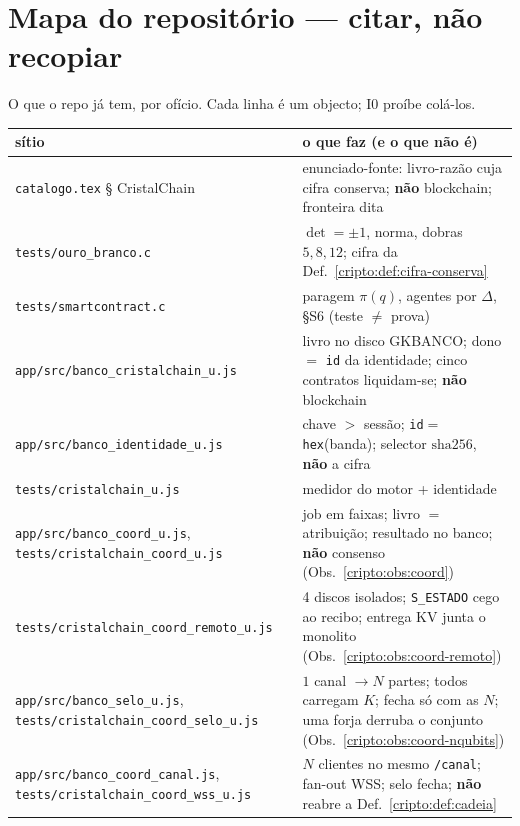 \documentclass[11pt,a4paper]{article}
\newcommand{\code}[1]{\texttt{\small #1}}
\begin{document}
\section{Mapa do repositório --- citar, não recopiar}\label{cripto:mapa}

O que o repo já tem, por ofício. Cada linha é um objecto;
I0 proíbe colá-los.

\begin{center}\small
\begin{tabular}{@{}p{}p{}@{}}
\toprule
sítio & o que faz (e o que \textbf{não} é) \\
\midrule
\code{catalogo.tex} § CristalChain
  & enunciado-fonte: livro-razão cuja cifra conserva;
    \textbf{não} blockchain; fronteira dita \\
\code{tests/ouro\_branco.c}
  & $\det=\pm1$, norma, dobras $5,8,12$; cifra da Def.~\ref{cripto:def:cifra-conserva} \\
\code{tests/smartcontract.c}
  & paragem $\pi(q)$, agentes por $\Delta$, §S6 (teste $\neq$ prova) \\
\code{app/src/banco\_cristalchain\_u.js}
  & livro no disco GKBANCO; dono $=$ \code{id} da identidade;
    cinco contratos liquidam-se; \textbf{não} blockchain \\
\code{app/src/banco\_identidade\_u.js}
  & chave $>$ sessão; \code{id}$=$\code{hex}(banda);
    selector $\mathrm{sha256}$, \textbf{não} a cifra \\
\code{tests/cristalchain\_u.js}
  & medidor do motor + identidade \\
\code{app/src/banco\_coord\_u.js},
\code{tests/cristalchain\_coord\_u.js}
  & job em faixas; livro $=$ atribuição;
    resultado no banco; \textbf{não} consenso
    (Obs.~\ref{cripto:obs:coord}) \\
\code{tests/cristalchain\_coord\_remoto\_u.js}
  & 4 discos isolados; \code{S\_ESTADO} cego ao recibo;
    entrega KV junta o monolito
    (Obs.~\ref{cripto:obs:coord-remoto}) \\
\code{app/src/banco\_selo\_u.js},
\code{tests/cristalchain\_coord\_selo\_u.js}
  & $1$ canal $\to N$ partes; todos carregam $K$;
    fecha só com as $N$; uma forja derruba o conjunto
    (Obs.~\ref{cripto:obs:coord-nqubits}) \\
\code{app/src/banco\_coord\_canal.js},
\code{tests/cristalchain\_coord\_wss\_u.js}
  & $N$ clientes no mesmo \code{/canal}; fan-out WSS;
    selo fecha; \textbf{não} reabre a Def.~\ref{cripto:def:cadeia}

\end{tabular}
\end{center}
\end{document}
